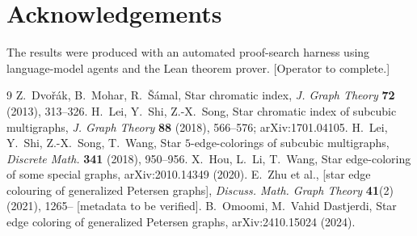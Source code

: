 \documentclass[11pt]{amsart}
\theoremstyle{definition}
\theoremstyle{remark}
\newcommand{\Lean}{\textsf{Lean}}
\begin{document}
\section*{Acknowledgements}
The results were produced with an automated proof-search harness using language-model agents and the \Lean{} theorem prover. [Operator to complete.]

\begin{thebibliography}{9}
 Z.~Dvo\v{r}\'ak, B.~Mohar, R.~\v{S}\'amal, Star chromatic index, \emph{J. Graph Theory} \textbf{72} (2013), 313--326.
 H.~Lei, Y.~Shi, Z.-X.~Song, Star chromatic index of subcubic multigraphs, \emph{J. Graph Theory} \textbf{88} (2018), 566--576; arXiv:1701.04105.
 H.~Lei, Y.~Shi, Z.-X.~Song, T.~Wang, Star $5$-edge-colorings of subcubic multigraphs, \emph{Discrete Math.} \textbf{341} (2018), 950--956.
 X.~Hou, L.~Li, T.~Wang, Star edge-coloring of some special graphs, arXiv:2010.14349 (2020).
 E.~Zhu et al., [star edge colouring of generalized Petersen graphs], \emph{Discuss. Math. Graph Theory} \textbf{41}(2) (2021), 1265-- [metadata to be verified].
 B.~Omoomi, M.~Vahid Dastjerdi, Star edge coloring of generalized Petersen graphs, arXiv:2410.15024 (2024).
\end{thebibliography}
\end{document}

